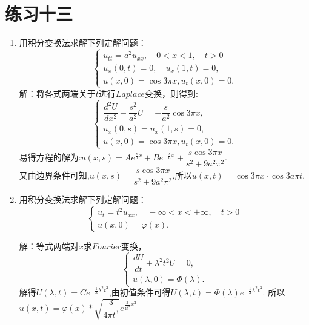 \documentclass[11pt]{article}
\begin{document}
\section*{练习十三}
    \begin{enumerate}
    \item 用积分变换法求解下列定解问题：
       \[
    \left\{
     \begin{array}{lr}
     u_{tt}=a^2u_{xx}, \quad 0<x<1,\quad t>0 \\
     u_x(0,t)=0,\quad u_x(1,t)=0,\\
     u(x,0)=\cos 3\pi x, u_t(x,0)=0.
     \end{array}
    \right. \]
        解：将各式两端关于$t$进行$Laplace$变换，则得到:
    \begin{equation*}
        \left\{
         \begin{array}{lr}
             \dfrac{d^2 U}{dx^2}-\dfrac{s^2}{a^2}U=-\dfrac{s}{a^2}\cos 3\pi x,\\u_x(0,s)=u_x(1,s)=0,\\u(x,0)=\cos 3\pi x,u_t(x,0)=0.

         \end{array}
        \right.
     \end{equation*}
    易得方程的解为:$u(x,s)=Ae^{\frac{s}{a}x}+Be^{-\frac{s}{a}x}+\dfrac{s\cos 3\pi x}{s^2+9a^2 \pi^2}$.
    \\又由边界条件可知,$u(x,s)=\dfrac{s\cos 3\pi x}{s^2+9a^2 \pi^2}$,所以$u(x,t)=\cos 3\pi x \cdot \cos 3a\pi t$.

    \item  用积分变换法求解下列定解问题：
    \[
    \left\{
     \begin{array}{lr}
     u_{t}=t^2u_{xx},\quad -\infty<x<+\infty,\quad t>0 \\
     u(x,0)=\varphi(x).
     \end{array}
    \right. \]

    解：等式两端对$x$求$Fourier$变换，
    \begin{equation*}
        \left\{
         \begin{array}{lr}
             \dfrac{dU}{dt}+\lambda^2 t^{2}U=0,\\u(\lambda,0)=\Phi(\lambda).
         \end{array}
        \right.
     \end{equation*}
    解得$U(\lambda,t)=Ce^{-\frac{1}{3}\lambda^2 t^3}$,由初值条件可得$U(\lambda,t)=\Phi(\lambda)e^{-\frac{1}{3}\lambda^2 t^3}$.
    所以$u(x,t)=\varphi(x)\ast \sqrt {\dfrac{3}{4\pi t^3}}e^{\frac{3}{4t^3}x^2}$



\end{enumerate}
\end{document}
